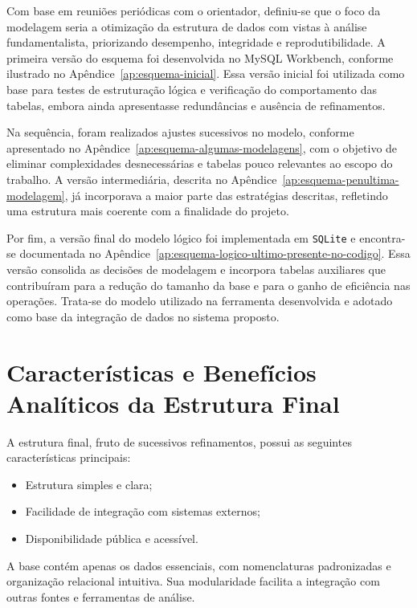 Com base em reuniões periódicas com o orientador, definiu-se que o foco da modelagem seria a otimização da estrutura de dados com vistas à análise fundamentalista, priorizando desempenho, integridade e reprodutibilidade. A primeira versão do esquema foi desenvolvida no MySQL Workbench, conforme ilustrado no Apêndice~\ref{ap:esquema-inicial}. Essa versão inicial foi utilizada como base para testes de estruturação lógica e verificação do comportamento das tabelas, embora ainda apresentasse redundâncias e ausência de refinamentos.

Na sequência, foram realizados ajustes sucessivos no modelo, conforme apresentado no Apêndice~\ref{ap:esquema-algumas-modelagens}, com o objetivo de eliminar complexidades desnecessárias e tabelas pouco relevantes ao escopo do trabalho. A versão intermediária, descrita no Apêndice~\ref{ap:esquema-penultima-modelagem}, já incorporava a maior parte das estratégias descritas, refletindo uma estrutura mais coerente com a finalidade do projeto.

Por fim, a versão final do modelo lógico foi implementada em \texttt{SQLite} e encontra-se documentada no Apêndice~\ref{ap:esquema-logico-ultimo-presente-no-codigo}. Essa versão consolida as decisões de modelagem e incorpora tabelas auxiliares que contribuíram para a redução do tamanho da base e para o ganho de eficiência nas operações. Trata-se do modelo utilizado na ferramenta desenvolvida e adotado como base da integração de dados no sistema proposto.


\section{Características e Benefícios Analíticos da Estrutura Final}

A estrutura final, fruto de sucessivos refinamentos, possui as seguintes características principais:

\begin{itemize}
	\item Estrutura simples e clara;
	\item Facilidade de integração com sistemas externos;
	\item Disponibilidade pública e acessível.
\end{itemize}

A base contém apenas os dados essenciais, com nomenclaturas padronizadas e organização relacional intuitiva. Sua modularidade facilita a integração com outras fontes e ferramentas de análise.

